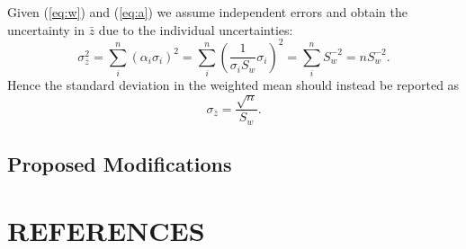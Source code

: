 \documentclass[12pt,letterpaper,margin=0.5in]{report}
\begin{document}
Given (\ref{eq:w}) and (\ref{eq:a}) we assume independent errors and obtain the uncertainty in $\bar{z}$ due to the individual uncertainties:
\begin{equation}
	\sigma_{\bar{z}}^2 = \sum_i^n \left (\alpha_i \sigma_i \right )^2 = \sum_i^n \left (\frac{1}{\sigma_i S_w} \sigma_i \right )^2 = \sum_i^n S_w^{-2} = nS_w^{-2}.
	\label{eq:v}
\end{equation}
Hence the standard deviation in the weighted mean should instead be reported as
\begin{equation}
	\sigma_{\bar{z}} = \frac{\sqrt{n}}{S_w}.
	\label{eq:s}
\end{equation}

\subsection*{Proposed Modifications}


\section*{REFERENCES}
\end{document}
